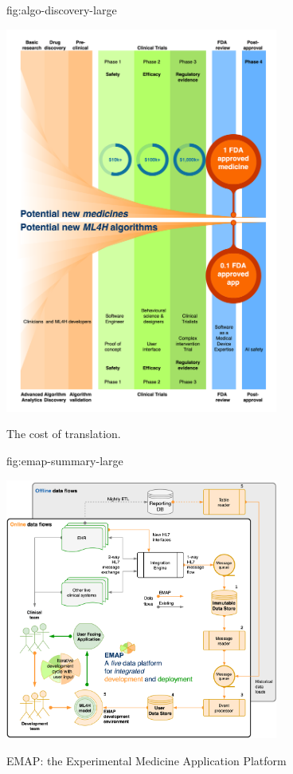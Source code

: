 \documentclass[pmlr,twocolumn,10pt]{jmlr} %
\begin{document}
\begin{figure}[htbp]
\floatconts
  {fig:algo-discovery-large}
  {\caption{The cost of translation.}}
 {\includegraphics[width=0.8\textwidth]{images/emap-summary-funnel.png}}

\end{figure}

\begin{figure}[htbp]
\floatconts
  {fig:emap-summary-large}
  {\caption{EMAP: the Experimental Medicine Application Platform}}
 {\includegraphics[width=0.8\textwidth]{images/emap-summary-emap-summary.png}}

\end{figure}
\end{document}
